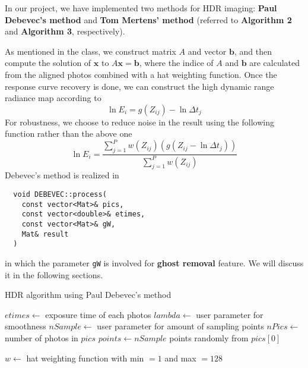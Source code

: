 In our project, we have implemented two methods for HDR imaging: \textbf{Paul Debevec's method} \cite{ref:debevec} and \textbf{Tom Mertens' method} \cite{ref:mertens} (referred to \textbf{Algorithm 2} and \textbf{Algorithm 3}, respectively).

As mentioned in the class, we construct matrix $A$ and vector $\textbf{b}$, and then compute the solution of $\textbf{x}$ to $A\textbf{x}=\textbf{b}$, where the indice of $A$ and $\textbf{b}$ are calculated from the aligned photos combined with a hat weighting function. Once the response curve recovery is done, we can construct the high dynamic range radiance map according to \cite{ref:debevec}
$$\ln E_i=g(Z_{ij})-\ln\Delta t_j$$
For robustness, we choose to reduce noise in the result using the following function rather than the above one
$$\ln E_i=\frac{\sum_{j=1}^P w(Z_{ij})(g(Z_{ij}-\ln\Delta t_j))}{\sum_{j=1}^Pw(Z_{ij})}$$
Debevec's method is realized in 
\begin{lstlisting}
  void DEBEVEC::process(
    const vector<Mat>& pics, 
    const vector<double>& etimes, 
    const vector<Mat>& gW, 
    Mat& result
  )
\end{lstlisting}
in which the parameter \texttt{gW} is involved for \textbf{ghost removal} feature. We will discuss it in the following sections.

\begin{algorithm}
\caption{HDR algorithm using Paul Debevec's method \cite{ref:debevec}}
\begin{algorithmic}[1]
\State $etimes\gets$ exposure time of each photos
\State $lambda\gets$ user parameter for smoothness
\State $nSample\gets$ user parameter for amount of sampling points
\State $nPics\gets$ number of photos in $pics$
\State $points\gets nSample$ points randomly from $pics[0]$

  \State $w\gets$ hat weighting function with min $=1$ and max $=128$
\end{algorithmic}
\end{algorithm}

